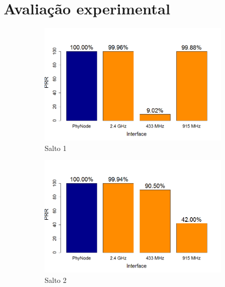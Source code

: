 \documentclass[
	12pt,				%
	openright,			%
	oneside,
	a4paper,			%
	english,			%
	french,				%
	spanish,			%
	brazil				%
	]{abntex2}
\begin{document}
\chapter{Avaliação experimental} \label{chap_exp}

\begin{figure}[htb]
	\centering
	\caption{PRR (Transmissão através de todas as interfaces)}
	\label{fig_prr_no_opt}
	\begin{subfigure}{.5\textwidth}
		\centering
		\includegraphics[width=.98\linewidth]{PRR_Salto1}
		\captionsetup{width=.9\textwidth}
		\caption{Salto 1}
		\label{prr_no_opt_s1}
	\end{subfigure}%
	\begin{subfigure}{.5\textwidth}
		\centering
		\includegraphics[width=.98\linewidth]{PRR_Salto2}
		\captionsetup{width=.9\textwidth}
		\caption{Salto 2}
		\label{prr_no_opt_s2}
	\end{subfigure}
	\begin{subfigure}{.5\textwidth}

\end{subfigure}
\end{figure}
\end{document}

